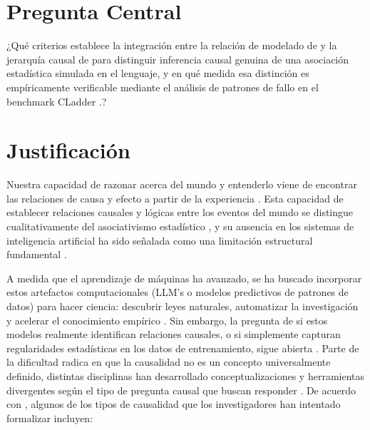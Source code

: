 \documentclass{article}
\begin{document}
\section{Pregunta Central}

¿Qué criterios establece la integración entre la relación de modelado de \textcite{rosen2012anticipatory} y 
la jerarquía causal de \textcite{pearl2009causality} para distinguir inferencia causal genuina de una asociación estadística simulada en el lenguaje, 
y en qué medida esa distinción es empíricamente verificable mediante el análisis de patrones de fallo en el benchmark CLadder \parencite{jin2023cladder}.?

\section{Justificación}

Nuestra capacidad de razonar acerca del mundo y entenderlo viene de encontrar las relaciones de causa y efecto a partir
de la experiencia \parencite{rosen2012anticipatory,pearl2009causality, spirtes2000causation}. 
Esta capacidad de establecer relaciones causales y 
lógicas entre los eventos del mundo se distingue cualitativamente del 
asociativismo estadístico \parencite{penn2007causal}, y su ausencia en los sistemas de inteligencia 
artificial ha sido señalada como una limitación estructural fundamental \parencite{Zecevic2023CausalPL, li2023counterfactual}.

A medida que el aprendizaje de máquinas ha avanzado, se ha buscado incorporar estos artefactos 
computacionales (LLM's o modelos predictivos de patrones de datos) para
hacer ciencia: descubrir leyes naturales, automatizar la investigación y acelerar 
el conocimiento empírico \parencite{hey2009fourth,king2009automation,verma2025causal}. 
Sin embargo, la pregunta de si estos 
modelos realmente identifican relaciones causales, o si simplemente capturan 
regularidades estadísticas en los datos de entrenamiento, sigue abierta 
\parencite{kiciman2023causal,chen2024clear, hobbhahn2022investigating, li2023counterfactual}. 
Parte de la dificultad radica en que la causalidad no es un concepto 
universalmente definido, distintas disciplinas han desarrollado conceptualizaciones y 
herramientas divergentes según el tipo de pregunta causal que buscan 
responder \parencite{halpern2016actual,peters2017elements}. De acuerdo con \textcite{kiciman2023causal}, algunos de los tipos de causalidad que los investigadores han intentado formalizar incluyen:
\end{document}
